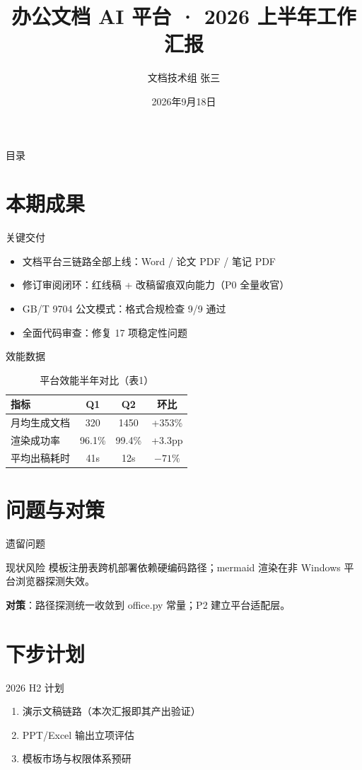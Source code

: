 \documentclass[plain]{harryopo-slides}
\title[2026 H1 工作汇报]{办公文档 AI 平台 · 2026 上半年工作汇报}
\author{文档技术组 张三}
\institute{示例集团 信息技术部}
\date{2026年9月18日}
\begin{document}
\begin{frame}[plain]\titlepage\end{frame}

\begin{frame}{目录}
\tableofcontents
{}
\end{frame}

\section{本期成果}
\begin{frame}{关键交付}
\begin{itemize}
  \item 文档平台三链路全部上线：Word / 论文 PDF / 笔记 PDF
  \item 修订审阅闭环：红线稿 + 改稿留痕双向能力（\alert{P0 全量收官}）
  \item GB/T 9704 公文模式：格式合规检查 9/9 通过
  \item 全面代码审查：修复 17 项稳定性问题
\end{itemize}
\end{frame}

\begin{frame}{效能数据}
\begin{table}
\centering
\begin{tabular}{lccc}
\toprule
指标 & Q1 & Q2 & 环比 \\
\midrule
月均生成文档 & 320 & 1450 & \alert{+353\%} \\
渲染成功率 & 96.1\% & 99.4\% & +3.3pp \\
平均出稿耗时 & 41s & 12s & $-71\%$ \\
\bottomrule
\end{tabular}
\caption{平台效能半年对比（表1）}
\end{table}
\end{frame}

\section{问题与对策}
\begin{frame}{遗留问题}
\begin{block}{现状风险}
模板注册表跨机部署依赖硬编码路径；mermaid 渲染在非 Windows 平台浏览器探测失效。
\end{block}
\textbf{对策}：路径探测统一收敛到 office.py 常量；P2 建立平台适配层。
\end{frame}

\section{下步计划}
\begin{frame}{2026 H2 计划}
\begin{enumerate}
  \item 演示文稿链路（本次汇报即其产出验证）
  \item PPT/Excel 输出立项评估
  \item 模板市场与权限体系预研
\end{enumerate}
\end{frame}

\begin{frame}[plain]
\begin{center}\vspace{2em}{\LARGE 谢谢，请指示}\end{center}
\end{frame}
\end{document}
